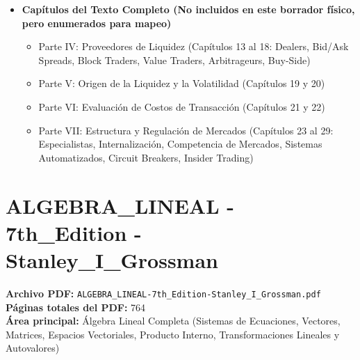 \documentclass[11pt,a4paper]{article}
\begin{document}
\begin{itemize}
    \item \textbf{Capítulos del Texto Completo (No incluidos en este borrador físico, pero enumerados para mapeo)}
    \begin{itemize}
        \item Parte IV: Proveedores de Liquidez (Capítulos 13 al 18: Dealers, Bid/Ask Spreads, Block Traders, Value Traders, Arbitrageurs, Buy-Side)
        \item Parte V: Origen de la Liquidez y la Volatilidad (Capítulos 19 y 20)
        \item Parte VI: Evaluación de Costos de Transacción (Capítulos 21 y 22)
        \item Parte VII: Estructura y Regulación de Mercados (Capítulos 23 al 29: Especialistas, Internalización, Competencia de Mercados, Sistemas Automatizados, Circuit Breakers, Insider Trading)
    \end{itemize}
\end{itemize}

\newpage

\section{ALGEBRA\_LINEAL - 7th\_Edition - Stanley\_I\_Grossman}
\textbf{Archivo PDF:} \texttt{ALGEBRA\_LINEAL-7th\_Edition-Stanley\_I\_Grossman.pdf} \\
\textbf{Páginas totales del PDF:} 764 \\
\textbf{Área principal:} Álgebra Lineal Completa (Sistemas de Ecuaciones, Vectores, Matrices, Espacios Vectoriales, Producto Interno, Transformaciones Lineales y Autovalores)
\end{document}
